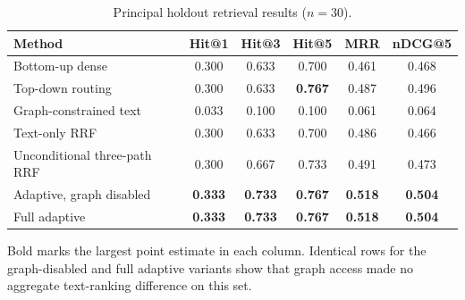 \begin{table}[t]
\centering
\begin{threeparttable}
\caption{Principal holdout retrieval results ($n=30$).}
\label{tab:principal}
\begin{tabular}{lccccc}
\toprule
Method & Hit@1 & Hit@3 & Hit@5 & MRR & nDCG@5 \\
\midrule
Bottom-up dense & 0.300 & 0.633 & 0.700 & 0.461 & 0.468 \\
Top-down routing & 0.300 & 0.633 & \textbf{0.767} & 0.487 & 0.496 \\
Graph-constrained text & 0.033 & 0.100 & 0.100 & 0.061 & 0.064 \\
Text-only RRF & 0.300 & 0.633 & 0.700 & 0.486 & 0.466 \\
Unconditional three-path RRF & 0.300 & 0.667 & 0.733 & 0.491 & 0.473 \\
Adaptive, graph disabled & \textbf{0.333} & \textbf{0.733} & \textbf{0.767} & \textbf{0.518} & \textbf{0.504} \\
Full adaptive & \textbf{0.333} & \textbf{0.733} & \textbf{0.767} & \textbf{0.518} & \textbf{0.504} \\
\bottomrule
\end{tabular}
\begin{tablenotes}[flushleft]\footnotesize
\item Bold marks the largest point estimate in each column. Identical rows for the graph-disabled and full adaptive variants show that graph access made no aggregate text-ranking difference on this set.
\end{tablenotes}
\end{threeparttable}
\end{table}
